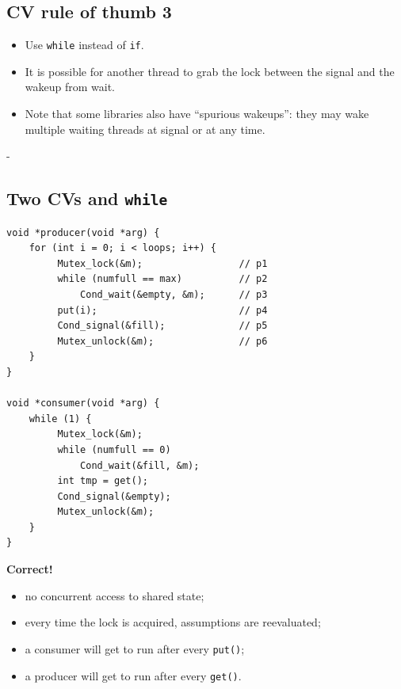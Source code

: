 \documentclass[11pt,a4paper]{article}
\makeatletter
\newcommand{\keepspace}[1]{\par\penalty-100\begingroup
  \setlength{\dimen@}{#1}\dimen@ii\pagegoal\advance\dimen@ii-\pagetotal
  \ifdim\dimen@>\dimen@ii\ifdim\dimen@ii>\z@\vfil\fi\break\fi\endgroup}
\makeatother
\begin{document}
\subsection{CV rule of thumb 3}

\begin{keybox}
\begin{itemize}
  \item Use \texttt{while} instead of \texttt{if}.
  \item It is possible for another thread to grab the lock between the
        signal and the wakeup from wait.
  \item Note that some libraries also have ``spurious wakeups'': they may
        wake multiple waiting threads at signal or at any time.
\end{itemize}
\end{keybox}

\keepspace{24\baselineskip}
\subsection{Two CVs and \texttt{while}}

\begin{lstlisting}
void *producer(void *arg) {
    for (int i = 0; i < loops; i++) {
         Mutex_lock(&m);                 // p1
         while (numfull == max)          // p2
             Cond_wait(&empty, &m);      // p3
         put(i);                         // p4
         Cond_signal(&fill);             // p5
         Mutex_unlock(&m);               // p6
    }
}

void *consumer(void *arg) {
    while (1) {
         Mutex_lock(&m);
         while (numfull == 0)
             Cond_wait(&fill, &m);
         int tmp = get();
         Cond_signal(&empty);
         Mutex_unlock(&m);
    }
}
\end{lstlisting}

\begin{solbox}
\textbf{Correct!}
\begin{itemize}
  \item no concurrent access to shared state;
  \item every time the lock is acquired, assumptions are reevaluated;
  \item a consumer will get to run after every \texttt{put()};
  \item a producer will get to run after every \texttt{get()}.
\end{itemize}
\end{solbox}
\end{document}
